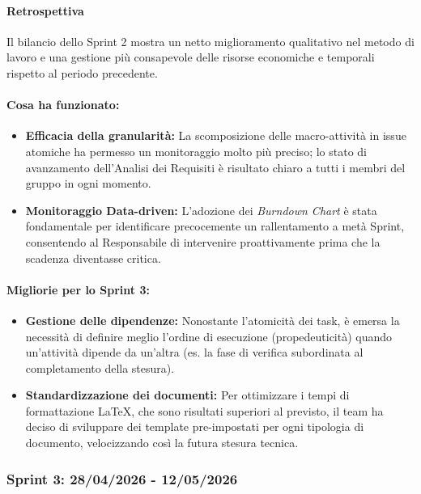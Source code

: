 \documentclass[12pt, a4paper]{article}
\begin{document}
{\paragraph{Retrospettiva}
Il bilancio dello Sprint 2 mostra un netto miglioramento qualitativo nel metodo di lavoro e una gestione più consapevole delle risorse economiche e temporali rispetto al periodo precedente.

\paragraph{Cosa ha funzionato:}
\begin{itemize}
    \item \textbf{Efficacia della granularità:} La scomposizione delle macro-attività in issue atomiche ha permesso un monitoraggio molto più preciso; lo stato di avanzamento dell'Analisi dei Requisiti è risultato chiaro a tutti i membri del gruppo in ogni momento.
    \item \textbf{Monitoraggio Data-driven:} L'adozione dei \textit{Burndown Chart} è stata fondamentale per identificare precocemente un rallentamento a metà Sprint, consentendo al Responsabile di intervenire proattivamente prima che la scadenza diventasse critica.
\end{itemize}

\paragraph{Migliorie per lo Sprint 3:}
\begin{itemize}
    \item \textbf{Gestione delle dipendenze:} Nonostante l'atomicità dei task, è emersa la necessità di definire meglio l'ordine di esecuzione (propedeuticità) quando un'attività dipende da un'altra (es. la fase di verifica subordinata al completamento della stesura).
    \item \textbf{Standardizzazione dei documenti:} Per ottimizzare i tempi di formattazione LaTeX, che sono risultati superiori al previsto, il team ha deciso di sviluppare dei template pre-impostati per ogni tipologia di documento, velocizzando così la futura stesura tecnica.
\end{itemize}

\subsubsection{Sprint 3: 28/04/2026 - 12/05/2026}

}
\end{document}
